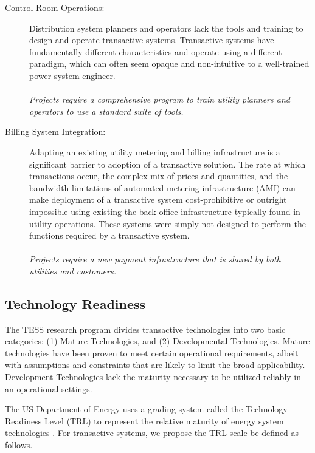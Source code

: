 \begin{description}
    \item[Control Room Operations:] Distribution system planners and operators lack the tools and training to design and operate transactive systems. Transactive systems have fundamentally different characteristics and operate using a different paradigm, which can often seem opaque and non-intuitive to a well-trained power system engineer.  
    \\~\\
    \textit{Projects require a comprehensive program to train utility planners and operators to use a standard suite of tools.} 

    \item[Billing System Integration:] Adapting an existing utility metering and billing infrastructure is a significant barrier to adoption of a transactive solution.  The rate at which transactions occur, the complex mix of prices and quantities, and the bandwidth limitations of automated metering infrastructure (AMI) can make deployment of a transactive system cost-prohibitive or outright impossible using existing the back-office infrastructure typically found in utility operations. These systems were simply not designed to perform the functions required by a transactive system.  
    \\~\\
    \textit{Projects require a new payment infrastructure that is shared by both utilities and customers.}

\end{description}

\subsection{Technology Readiness}

The TESS research program divides transactive technologies into two basic categories: (1) Mature Technologies, and (2) Developmental Technologies.  Mature technologies have been proven to meet certain operational requirements, albeit with assumptions and constraints that are likely to limit the broad applicability.  Development Technologies lack the maturity necessary to be utilized reliably in an operational settings.

The US Department of Energy uses a grading system called the Technology Readiness Level (TRL) to represent the relative maturity of energy system technologies \cite{DOE-G413-2009}. For transactive systems, we propose the TRL scale be defined as follows.

